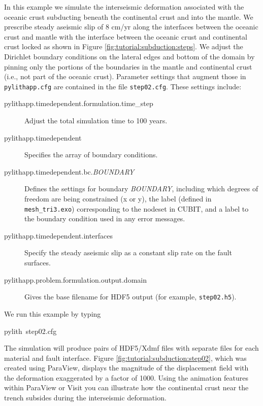 In this example we simulate the interseismic deformation associated
with the oceanic crust subducting beneath the continental crust and
into the mantle. We prescribe steady aseismic slip of 8 cm/yr along
the interfaces between the oceanic crust and mantle with the interface
between the oceanic crust and continental crust locked as shown in
Figure \vref{fig:tutorial:subduction:steps}. We adjust the Dirichlet
boundary conditions on the lateral edges and bottom of the domain
by pinning only the portions of the boundaries in the mantle and continental
crust (i.e., not part of the oceanic crust). Parameter settings that
augment those in \texttt{pylithapp.cfg} are contained in the file
\texttt{step02.cfg}. These settings include:
\begin{description}
\item [{pylithapp.timedependent.formulation.time\_step}] Adjust the total
simulation time to 100 years.
\item [{pylithapp.timedependent}] Specifies the array of boundary conditions.
\item [{pylithapp.timedependent.bc.\textit{BOUNDARY}}] Defines the settings
for boundary \textit{BOUNDARY}, including which degrees of freedom
are being constrained (x or y), the label (defined in\texttt{ mesh\_tri3.exo})
corresponding to the nodeset in CUBIT, and a label to the boundary
condition used in any error messages.
\item [{pylithapp.timedependent.interfaces}] Specify the steady aseismic
slip as a constant slip rate on the fault surfaces. 
\item [{pylithapp.problem.formulation.output.domain}] Gives the base filename
for HDF5 output (for example, \texttt{step02.h5}).
\end{description}
We run this example by typing
\begin{lyxcode}
pylith~step02.cfg
\end{lyxcode}
The simulation will produce pairs of HDF5/Xdmf files with separate
files for each material and fault interface. Figure \vref{fig:tutorial:subduction:step02},
which was created using ParaView, displays the magnitude of the displacement
field with the deformation exaggerated by a factor of 1000. Using
the animation features within ParaView or Visit you can illustrate
how the continental crust near the trench subsides during the interseismic
deformation. 


